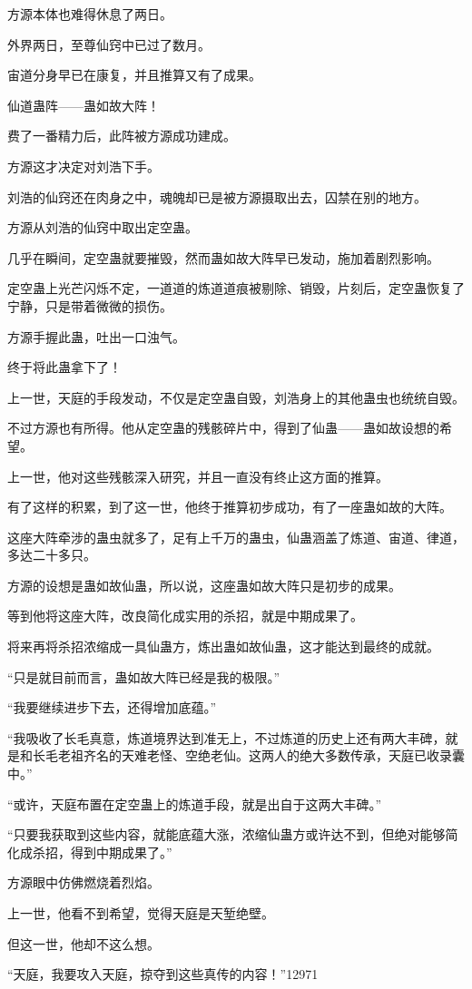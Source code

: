 \begin{this_body}
方源本体也难得休息了两日。

外界两日，至尊仙窍中已过了数月。

宙道分身早已在康复，并且推算又有了成果。

仙道蛊阵——蛊如故大阵！

费了一番精力后，此阵被方源成功建成。

方源这才决定对刘浩下手。

刘浩的仙窍还在肉身之中，魂魄却已是被方源摄取出去，囚禁在别的地方。

方源从刘浩的仙窍中取出定空蛊。

几乎在瞬间，定空蛊就要摧毁，然而蛊如故大阵早已发动，施加着剧烈影响。

定空蛊上光芒闪烁不定，一道道的炼道道痕被剔除、销毁，片刻后，定空蛊恢复了宁静，只是带着微微的损伤。

方源手握此蛊，吐出一口浊气。

终于将此蛊拿下了！

上一世，天庭的手段发动，不仅是定空蛊自毁，刘浩身上的其他蛊虫也统统自毁。

不过方源也有所得。他从定空蛊的残骸碎片中，得到了仙蛊——蛊如故设想的希望。

上一世，他对这些残骸深入研究，并且一直没有终止这方面的推算。

有了这样的积累，到了这一世，他终于推算初步成功，有了一座蛊如故的大阵。

这座大阵牵涉的蛊虫就多了，足有上千万的蛊虫，仙蛊涵盖了炼道、宙道、律道，多达二十多只。

方源的设想是蛊如故仙蛊，所以说，这座蛊如故大阵只是初步的成果。

等到他将这座大阵，改良简化成实用的杀招，就是中期成果了。

将来再将杀招浓缩成一具仙蛊方，炼出蛊如故仙蛊，这才能达到最终的成就。

“只是就目前而言，蛊如故大阵已经是我的极限。”

“我要继续进步下去，还得增加底蕴。”

“我吸收了长毛真意，炼道境界达到准无上，不过炼道的历史上还有两大丰碑，就是和长毛老祖齐名的天难老怪、空绝老仙。这两人的绝大多数传承，天庭已收录囊中。”

“或许，天庭布置在定空蛊上的炼道手段，就是出自于这两大丰碑。”

“只要我获取到这些内容，就能底蕴大涨，浓缩仙蛊方或许达不到，但绝对能够简化成杀招，得到中期成果了。”

方源眼中仿佛燃烧着烈焰。

上一世，他看不到希望，觉得天庭是天堑绝壁。

但这一世，他却不这么想。

“天庭，我要攻入天庭，掠夺到这些真传的内容！”12971

\end{this_body}

